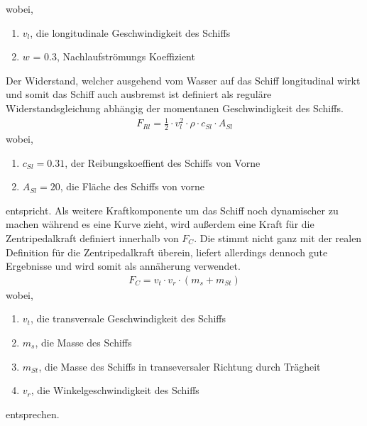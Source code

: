 \documentclass[]{iat}
\begin{document}
wobei,
\begin{enumerate}
    \item[] $v_l$, die longitudinale Geschwindigkeit des Schiffs
    \item[] $w$ = 0.3, Nachlaufströmungs Koeffizient
\end{enumerate}
Der Widerstand, welcher ausgehend vom Wasser auf das Schiff longitudinal wirkt und somit das Schiff auch ausbremst ist definiert als reguläre Widerstandsgleichung abhängig der momentanen Geschwindigkeit des Schiffs.
\begin{align}
    F_{Rl} = \frac{1}{2} \cdot v_l^2 \cdot \rho \cdot c_{Sl} \cdot A_{Sl} \label{eq:front_resistance}
\end{align}
wobei,
\begin{enumerate}
    \item[] $c_{Sl} = 0.31$, der Reibungskoeffient des Schiffs von Vorne
    \item[] $A_{Sl} = 20$, die Fläche des Schiffs von vorne
\end{enumerate}
entspricht. Als weitere Kraftkomponente um das Schiff noch dynamischer zu machen während es eine Kurve zieht, wird außerdem eine Kraft für die Zentripedalkraft definiert innerhalb von $F_C$. Die stimmt nicht ganz mit der realen Definition für die Zentripedalkraft überein, liefert allerdings dennoch gute Ergebnisse und wird somit als annäherung verwendet.
\begin{align}
    F_C = v_t \cdot v_r \cdot (m_{s}+ m_{St})
\end{align}
wobei,
\begin{enumerate}
    \item[] $v_t$, die transversale Geschwindigkeit des Schiffs
    \item[] $m_s$, die Masse des Schiffs
    \item[] $m_{St}$, die Masse des Schiffs in transeversaler Richtung durch Trägheit
    \item[] $v_r$, die Winkelgeschwindigkeit des Schiffs
\end{enumerate}
entsprechen.
\end{document}
